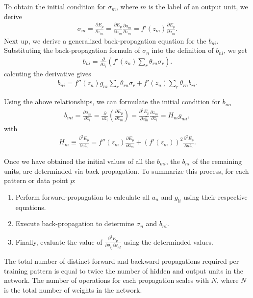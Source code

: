 To obtain the initial condition for $\sigma_m$, where $m$ is the label of an output unit, we derive
\begin{align}
\sigma_m =  \frac{\partial E_p}{\partial z_m} = \frac{\partial E_p}{\partial a_m} \frac{\partial a_m}{\partial z_m} = f'(z_m) \frac{\partial E_p}{\partial a_m}.
\end{align}
Next up, we derive a generalized back-propagation equation for the \(b_{ni}\). Substituting the back-propagation formula of \(\sigma_n\) into the definition of \(b_{ni}\), we get
\begin{align}
b_{ni} = \frac{\partial}{\partial z_i} \left( f'(z_n) \sum_r \theta_{rn} \sigma_r \right).
\end{align}
calcuting the derivative gives
\begin{align}
b_{ni} = f''(z_n) g_{ni} \sum_r \theta_{rn} \sigma_r + f'(z_n) \sum_r \theta_{rn} b_{ri}.
\end{align}

Using the above relationships, we can formulate the initial condition for $b_{mi}$
\begin{align}
b_{mi} = \frac{\partial \sigma_m}{\partial z_i} =  \frac{\partial }{\partial z_i}\left(\frac{\partial E_p}{\partial z_m} \right) = \frac{\partial^2 E_p}{\partial z_m^2} \frac{\partial z_m }{\partial z_i} = H_m g_{mi},
\end{align}
with
\begin{align}
H_m \equiv \frac{\partial^2 E_p}{\partial z_m^2} = f''(z_m) \frac{\partial E_p}{\partial a_m} + (f'(z_m))^2 \frac{\partial^2 E_p}{\partial a_m^2}.
\end{align}

Once we have obtained the initial values of all the $b_{mi}$, the
$b_{ni}$ of the remaining units, are determinded via back-propagation.
To summarize this process, for each pattern or data point \( p \):

\begin{enumerate}
    \item Perform forward-propagation to calculate all \( a_n \) and \( g_{li} \) using their respective equations.
    \item Execute back-propagation to determine \( \sigma_n \) and \( b_{ni} \).
    \item Finally, evaluate the value of \(\frac{\partial^2 E_p}{\partial \theta_{ij} \partial \theta_{nl}}\) using the determinded values.
\end{enumerate}

The total number of distinct forward and backward propagations required per training pattern is equal to twice the number of hidden and output units in the network.
The number of operations for each propagation scales with \(N\), where \(N\) is the total number of weights in the network\cite{Bishop1992}.














